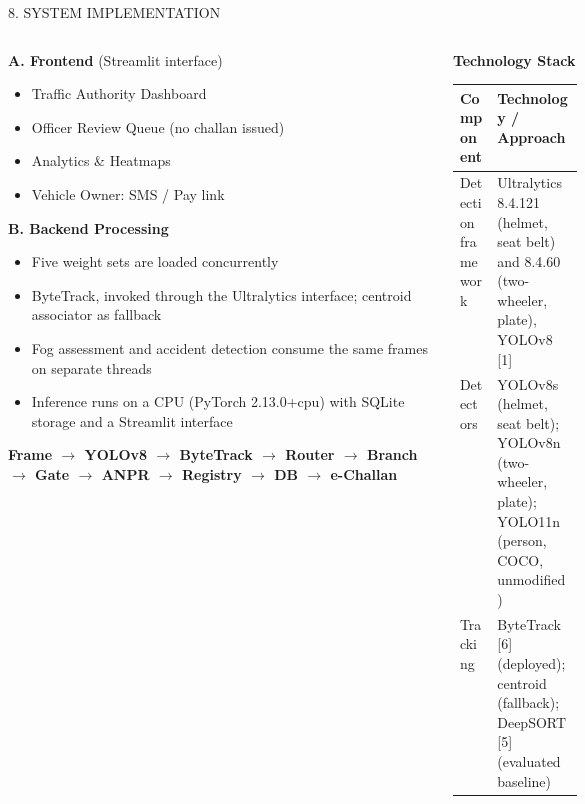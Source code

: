 \documentclass[aspectratio=169,10pt,t]{beamer}
\newcommand{\hd}[1]{{\color{dsblue}\textbf{#1}}}          %
\begin{document}
\begin{frame}{8. SYSTEM IMPLEMENTATION}
\begin{columns}[T,onlytextwidth]
\begin{column}{0.42\textwidth}
\scriptsize
\hd{\footnotesize A. Frontend} (Streamlit interface)
\begin{itemize}\setlength{\itemsep}{0.05em}
  \item Traffic Authority Dashboard
  \item Officer Review Queue (no challan issued)
  \item Analytics \& Heatmaps
  \item Vehicle Owner: SMS / Pay link
\end{itemize}
\vspace{0.3em}
\hd{\footnotesize B. Backend Processing}
\begin{itemize}\setlength{\itemsep}{0.05em}
  \item Five weight sets are loaded concurrently
  \item ByteTrack, invoked through the Ultralytics interface; centroid associator as fallback
  \item Fog assessment and accident detection consume the same frames on separate threads
  \item Inference runs on a CPU (PyTorch 2.13.0+cpu) with SQLite storage and a Streamlit interface
\end{itemize}
\vspace{0.2em}
{\scriptsize\color{dsblue}\textbf{Frame $\rightarrow$ YOLOv8 $\rightarrow$ ByteTrack $\rightarrow$ Router $\rightarrow$ Branch
$\rightarrow$ Gate $\rightarrow$ ANPR $\rightarrow$ Registry $\rightarrow$ DB $\rightarrow$ e-Challan}}
\end{column}
\begin{column}{0.55\textwidth}
\hd{\small Technology Stack}\\[0.2em]
\scriptsize
\begin{tabularx}{\linewidth}{@{}L{0.3\linewidth}Y@{}}
\toprule
\textbf{Component} & \textbf{Technology / Approach}\\
\midrule
Detection framework  & Ultralytics 8.4.121 (helmet, seat belt) and 8.4.60 (two-wheeler, plate), YOLOv8 [1]\\
Detectors            & YOLOv8s (helmet, seat belt); YOLOv8n (two-wheeler, plate); YOLO11n (person, COCO, unmodified)\\
Tracking             & ByteTrack [6] (deployed); centroid (fallback); DeepSORT [5] (evaluated baseline)\\

\end{tabularx}
\end{column}
\end{columns}
\end{frame}
\end{document}
